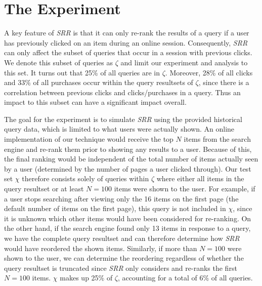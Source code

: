 \documentclass{article}
\begin{document}
\section{The Experiment}
A key feature of {\em SRR} is that it can only re-rank the results of a query if
a user has previously clicked on an item during an online session.
Consequently, {\em SRR} can only affect the subset of queries that occur in a
session with previous clicks. We denote this subset of queries as $\zeta$ and
limit our experiment and analysis to this set. It turns out that 25\% of all
queries are in $\zeta$. Moreover, 28\% of all clicks and 33\% of all purchases
occur within the query resultsets of $\zeta$, since there is a correlation
between previous clicks and clicks/purchases in a query.  Thus an impact to this
subset can have a significant impact overall.

The goal for the experiment is to simulate {\em SRR} using the provided
historical query data, which is limited to what users were actually shown. An
online implementation of our technique would receive the top $N$ items from the
search engine and re-rank them prior to showing any results to a user. Because
of this, the final ranking would be independent of the total number of items
actually seen by a user (determined by the number of pages a user clicked
through).  Our test set $\chi$ therefore consists solely of queries within
$\zeta$ where either all items in the query resultset or at least $N=100$ items
were shown to the user. For example, if a user stops searching after viewing
only the 16 items on the first page (the default number of items on the first
page), this query is not included in $\chi$, since it is unknown which other
items would have been considered for re-ranking. On the other hand, if the
search engine found only 13 items in response to a query,  we have the complete
query resultset and can therefore determine how {\em SRR} would have reordered
the shown items. Similarly, if more than $N=100$ were shown to the user, we can
determine the reordering regardless of whether the query resultset is truncated
since {\em SRR} only considers and re-ranks the first $N=100$ items. $\chi$
makes up 25\% of $\zeta$, accounting for a total of 6\% of all queries.
\end{document}
